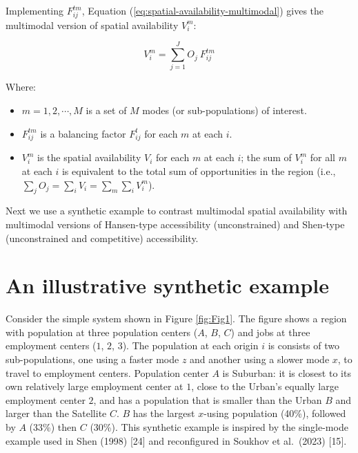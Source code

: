 \documentclass[10pt,letterpaper]{article}
\providecommand{\tightlist}{%
  \setlength{\itemsep}{0pt}\setlength{\parskip}{0pt}}
\begin{document}
Implementing \(F^{tm}_{ij}\), Equation
(\ref{eq:spatial-availability-multimodal}) gives the multimodal version
of spatial availability \(V_i^m\):

\begin{equation}
\label{eq:spatial-availability-multimodal}
V^m_{i} = \sum_{j=1}^J O_j\ F^{tm}_{ij}
\end{equation}

\noindent Where:

\begin{itemize}
\tightlist
\item
  \(m = 1, 2,\cdots, M\) is a set of \(M\) modes (or sub-populations) of
  interest.
\item
  \(F^{tm}_{ij}\) is a balancing factor \(F^t_{ij}\) for each \(m\) at
  each \(i\).
\item
  \(V^m_{i}\) is the spatial availability \(V_{i}\) for each \(m\) at
  each \(i\); the sum of \(V^m_{i}\) for all \(m\) at each \(i\) is
  equivalent to the total sum of opportunities in the region (i.e.,
  \(\sum_j O_j = \sum_i V_i = \sum_{m} \sum_{i} V^m_{i}\)).
\end{itemize}

Next we use a synthetic example to contrast multimodal spatial
availability with multimodal versions of Hansen-type accessibility
(unconstrained) and Shen-type (unconstrained and competitive)
accessibility.

\hypertarget{an-illustrative-synthetic-example}{%
\section{An illustrative synthetic
example}\label{an-illustrative-synthetic-example}}

Consider the simple system shown in Figure \ref{fig:Fig1}. The figure
shows a region with population at three population centers (\(A\),
\(B\), \(C\)) and jobs at three employment centers (\(1\), \(2\),
\(3\)). The population at each origin \(i\) is consists of two
sub-populations, one using a faster mode \(z\) and another using a
slower mode \(x\), to travel to employment centers. Population center
\(A\) is Suburban: it is closest to its own relatively large employment
center at \(1\), close to the Urban's equally large employment center
\(2\), and has a population that is smaller than the Urban \(B\) and
larger than the Satellite \(C\). \(B\) has the largest \(x\)-using
population (40\%), followed by \(A\) (33\%) then \(C\) (30\%). This
synthetic example is inspired by the single-mode example used in Shen
(1998) {[}24{]} and reconfigured in Soukhov et al.~(2023) {[}15{]}.
\end{document}
